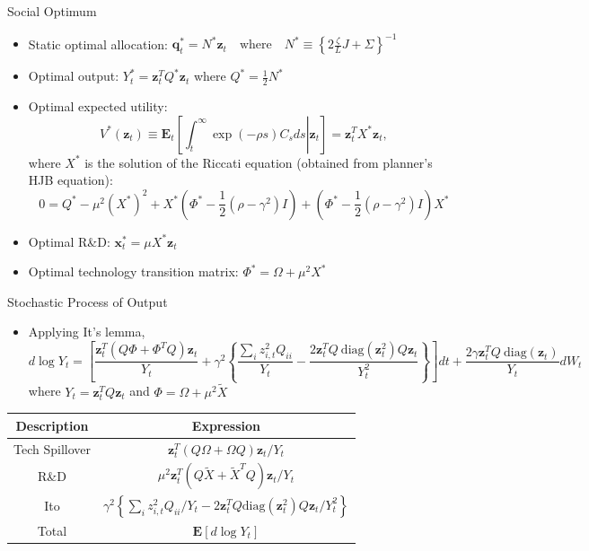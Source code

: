 \documentclass[
  aspectratio=169,  %
  handout           %
]{beamer}
\theoremstyle{plain}
\begin{document}
%
\begin{frame}{Social Optimum }

  \label{optimal}
  \begin{itemize}
    \item Static optimal allocation: $\symbf{q}_{t}^{*}=N^{*}\symbf{z}_{t}\quad\text{where}\quad N^{*}\equiv\left\{ 2\frac{\zeta}{L}J+\Sigma\right\} ^{-1}$
    \item Optimal output: $Y_{t}^{*}=\symbf{z}_{t}^{T}Q^{*}\symbf{z}_{t}$
          where $Q^{*}=\frac{1}{2}N^{*}$
    \item Optimal expected utility:
          \[
            V^{*}\left(\symbf{z}_{t}\right)\equiv\symbf{E}_{t}\left[\left.\int_{t}^{\infty}\exp\left(-\rho s\right)C_{s}ds\right|\symbf{z}_{t}\right]=\symbf{z}_{t}^{T}X^{*}\symbf{z}_{t},
          \]
          where $X^{*}$ is the solution of the Riccati equation (obtained
          from planner's HJB equation):
          \[
            0=Q^{*}-\mu^{2}\left(X^{*}\right)^{2}+X^{*}\left(\Phi^{*}-\frac{1}{2}\left(\rho-\gamma^{2}\right)I\right)+\left(\Phi^{*}-\frac{1}{2}\left(\rho-\gamma^{2}\right)I\right)X^{*}
          \]
    \item Optimal R\&D: $\symbf{x}_{t}^{*}=\mu X^{*}\symbf{z}_{t}$
    \item Optimal technology transition matrix: $\Phi^{*}=\Omega+\mu^{2}X^{*}$
  \end{itemize}
  \hyperlink{aggregation}{}
\end{frame}
%
\begin{frame}{Stochastic Process of Output}

  \label{Y_process}
  \begin{itemize}
    \item Applying It's lemma, {\footnotesize
          \[
            d\log Y_{t}=\left[\frac{\symbf{z}_{t}^{T}\left(Q\Phi+\Phi^{T}Q\right)\symbf{z}_{t}}{Y_{t}}+\gamma^{2}\left\{ \frac{\sum_{i}z_{i,t}^{2}Q_{ii}}{Y_{t}}-\frac{2\symbf{z}_{t}^{T}Q\ \text{diag}\left(\symbf{z}_{t}^{2}\right)Q\symbf{z}_{t}}{Y_{t}^{2}}\right\} \right]dt+\frac{2\gamma\symbf{z}_{t}^{T}Q\ \text{diag}\left(\symbf{z}_{t}\right)}{Y_{t}}dW_{t}
          \]
          }where $Y_{t}=\symbf{z}_{t}^{T}Q\symbf{z}_{t}$ and $\Phi=\Omega+\mu^{2}\widetilde{X}$
  \end{itemize}
  \begin{center}
    \begin{tabular}{cc}
      \hline
      \hline Description & Expression\tabularnewline
      \hline
      Tech Spillover     & $\symbf{z}_{t}^{T}\left(Q\Omega+\Omega Q\right)\symbf{z}_{t}/Y_{t}$\tabularnewline
      R\&D               & $\mu^{2}\symbf{z}_{t}^{T}\left(Q\widetilde{X}+\widetilde{X}^{T}Q\right)\symbf{z}_{t}/Y_{t}$\tabularnewline
      Ito                & $\gamma^{2}\left\{ \sum_{i}z_{i,t}^{2}Q_{ii}/Y_{t}-2\symbf{z}_{t}^{T}Q\text{diag}\left(\symbf{z}_{t}^{2}\right)Q\symbf{z}_{t}/Y_{t}^{2}\right\} $\tabularnewline
      \hline
      Total              & $\symbf{E}\left[d\log Y_{t}\right]$\tabularnewline
      \hline
    \end{tabular}
    \par\end{center}
\end{frame}
\end{document}
